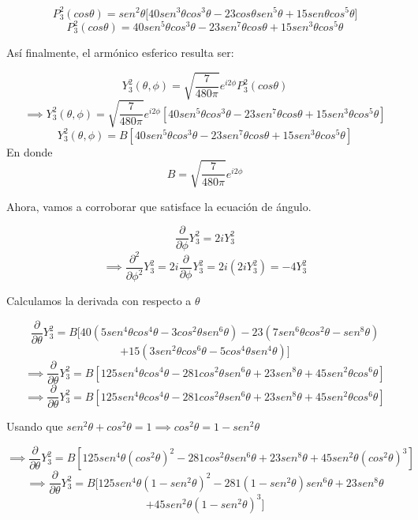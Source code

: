 \documentclass[10pt]{article}
\begin{document}
$$P_{3}^{2}(cos\theta)=sen^{2}\theta \bigg[40sen^{3}\theta cos^{3}\theta -23 cos\theta sen^{5}\theta + 15sen\theta cos^{5}\theta \bigg]$$
$$P_{3}^{2}(cos\theta)=40sen^{5}\theta cos^{3}\theta-23sen^{7}\theta cos\theta +15sen^{3}\theta cos^{5}\theta$$

Así finalmente, el armónico esferico resulta ser: 

$$Y_{3}^{2}(\theta , \phi ) =\sqrt{\frac{7}{480 \pi }}e^{i2\phi} P_{3}^{2}(cos\theta)$$
$$\implies Y_{3}^{2}(\theta , \phi ) =\sqrt{\frac{7}{480 \pi }}e^{i2\phi}[40sen^{5}\theta cos^{3}\theta-23sen^{7}\theta cos\theta +15sen^{3}\theta cos^{5}\theta] $$
$$Y_{3}^{2}(\theta, \phi)=B[40sen^{5}\theta cos^{3}\theta-23sen^{7}\theta cos\theta +15sen^{3}\theta cos^{5}\theta]$$
En donde $$B=\sqrt{\frac{7}{480 \pi }}e^{i2\phi}$$

Ahora, vamos a corroborar que satisface la ecuación de ángulo. 

$$\frac{\partial }{\partial \phi}Y_{3}^{2}=2iY_{3}^{2}$$
$$\implies \frac{\partial^{2}}{\partial \phi^{2}}Y_{3}^{2}=2i\frac{\partial}{\partial \phi}Y_{3}^{2}=2i(2iY_{3}^{2})=-4Y_{3}^{2}$$

Calculamos la derivada con respecto a $\theta$

$$\frac{\partial}{\partial \theta}Y_{3}^{2}=B[40(5sen^{4}\theta cos^{4}\theta-3cos^{2}\theta sen^{6}\theta )-23(7sen^{6}\theta cos^{2}\theta -sen^{8}\theta )$$
$$+15(3sen^{2}\theta cos^{6}\theta -5cos^{4}\theta sen^{4}\theta)]$$
$$\implies \frac{\partial}{\partial \theta}Y_{3}^{2}=B[125sen^{4}\theta cos^{4}\theta-281cos^{2}\theta sen^{6}\theta +23 sen^{8}\theta +45sen^{2}\theta cos^{6}\theta ]$$
$$\implies \frac{\partial}{\partial \theta}Y_{3}^{2}=B[125sen^{4}\theta cos^{4}\theta-281cos^{2}\theta sen^{6}\theta +23 sen^{8}\theta +45sen^{2}\theta cos^{6}\theta ]$$

Usando que $sen^{2}\theta +cos^{2}\theta = 1\implies cos^{2}\theta = 1-sen^{2}\theta$

$$\implies \frac{\partial}{\partial \theta}Y_{3}^{2}=B[125sen^{4}\theta (cos^{2}\theta)^{2}-281cos^{2}\theta sen^{6}\theta +23 sen^{8}\theta +45sen^{2}\theta (cos^{2}\theta)^{3} ]$$
$$\implies \frac{\partial}{\partial \theta}Y_{3}^{2}=B[125sen^{4}\theta (1-sen^{2}\theta)^{2}-281(1-sen^{2}\theta) sen^{6}\theta +23 sen^{8}\theta $$
$$+45sen^{2}\theta (1-sen^{2}\theta)^{3} ]$$
\end{document}
